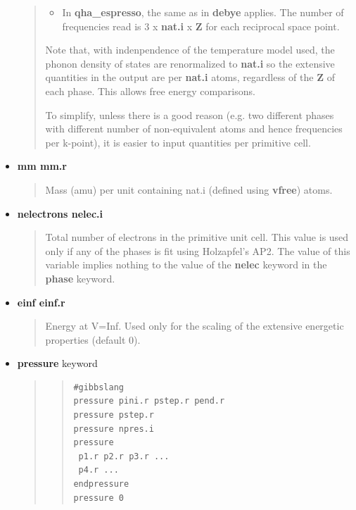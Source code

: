 \documentclass[a4paper]{article}
\begin{document}
\begin{itemize}
\begin{quote}
\begin{itemize}
\item In \textbf{qha\_espresso}, the same as in \textbf{debye} applies. The number
of frequencies read is 3 x \textbf{nat.i} x \textbf{Z} for each reciprocal
space point.

\end{itemize}

Note that, with indenpendence of the temperature model used, the
phonon density of states are renormalized to \textbf{nat.i} so the
extensive quantities in the output are per \textbf{nat.i} atoms,
regardless of the \textbf{Z} of each phase. This allows free energy
comparisons.

To simplify, unless there is a good reason (e.g. two different
phases with different number of non-equivalent atoms and hence
frequencies per k-point), it is easier to input quantities per
primitive cell.

\end{quote}

\item \textbf{mm mm.r}
%
\begin{quote}

Mass (amu) per unit containing nat.i (defined using \textbf{vfree})
atoms.

\end{quote}

\item \textbf{nelectrons nelec.i}
%
\begin{quote}

Total number of electrons in the primitive unit cell. This value is
used only if any of the phases is fit using Holzapfel's AP2. The
value of this variable implies nothing to the value of the
\textbf{nelec} keyword in the \textbf{phase} keyword.

\end{quote}

\item \textbf{einf einf.r}
%
\begin{quote}

Energy at V=Inf. Used only for the scaling of the extensive
energetic properties (default 0).

\end{quote}

\item \textbf{pressure} keyword
%
\begin{quote}
%
\begin{quote}
\begin{verbatim}
#gibbslang
pressure pini.r pstep.r pend.r
pressure pstep.r
pressure npres.i
pressure
 p1.r p2.r p3.r ...
 p4.r ...
endpressure
pressure 0
\end{verbatim}
\end{quote}


\end{quote}
\end{itemize}
\end{document}
